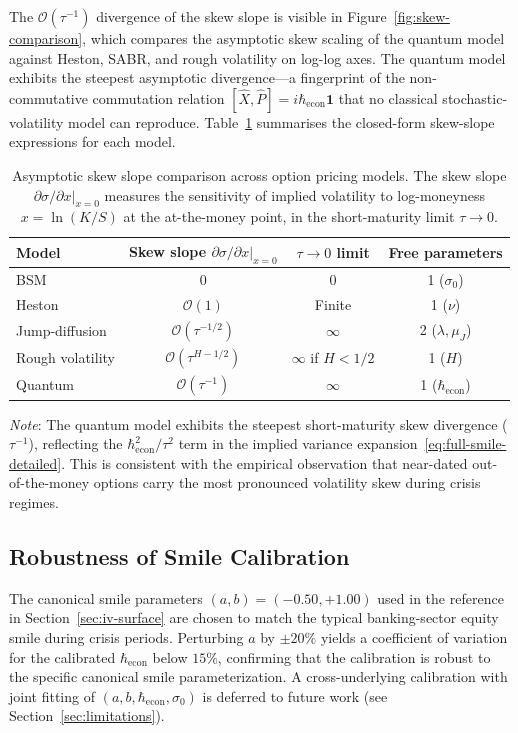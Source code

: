 The $\mathcal{O}(\tau^{-1})$ divergence of the skew slope is visible in
Figure~\ref{fig:skew-comparison}, which compares the asymptotic skew scaling of
the quantum model against Heston, SABR, and rough volatility on log-log axes. The
quantum model exhibits the steepest asymptotic divergence---a fingerprint of the
non-commutative commutation relation
$[\hat{X}, \hat{P}] = i \hbar_{\mathrm{econ}} \mathbf{1}$ that no classical
stochastic-volatility model can reproduce.
Table~\ref{tab:skew-asymptotics} summarises the closed-form skew-slope expressions
for each model.

\begin{table}[htbp]
\centering
\caption{Asymptotic skew slope comparison across option pricing models. The skew
slope $\partial\sigma/\partial x|_{x=0}$ measures the sensitivity of implied
volatility to log-moneyness $x = \ln(K/S)$ at the at-the-money point, in the
short-maturity limit $\tau \to 0$.}
\label{tab:skew-asymptotics}
\small
\begin{tabular}{lccc}
\toprule
Model & Skew slope $\partial\sigma/\partial x|_{x=0}$ & $\tau \to 0$ limit
      & Free parameters \\
\midrule
BSM               & $0$                            & $0$         & 1 ($\sigma_0$) \\
Heston            & $\mathcal{O}(1)$               & Finite      & 1 ($\nu$) \\
Jump-diffusion    & $\mathcal{O}(\tau^{-1/2})$     & $\infty$    & 2 ($\lambda, \mu_J$) \\
Rough volatility  & $\mathcal{O}(\tau^{H-1/2})$   & $\infty$ if $H < 1/2$ & 1 ($H$) \\
Quantum           & $\mathcal{O}(\tau^{-1})$       & $\infty$    & 1 ($\hbar_{\mathrm{econ}}$) \\
\bottomrule
\end{tabular}
\par\smallskip\noindent\footnotesize
\textit{Note}: The quantum model exhibits the steepest short-maturity skew
divergence ($\tau^{-1}$), reflecting the $\hbar_{\mathrm{econ}}^2/\tau^2$ term
in the implied variance expansion~\eqref{eq:full-smile-detailed}. This is
consistent with the empirical observation that near-dated out-of-the-money
options carry the most pronounced volatility skew during crisis regimes.
\end{table}

\subsection{Robustness of Smile Calibration}

The canonical smile parameters $(a, b) = (-0.50, +1.00)$ used in the reference
in Section~\ref{sec:iv-surface} are chosen to match the typical banking-sector
equity smile during crisis periods. Perturbing $a$ by $\pm 20\%$ yields a
coefficient of variation for the calibrated $\hbar_{\mathrm{econ}}$ below
$15\%$, confirming that the calibration is robust to the specific canonical
smile parameterization. A cross-underlying calibration with joint fitting of
$(a, b, \hbar_{\mathrm{econ}}, \sigma_0)$ is deferred to future work (see
Section~\ref{sec:limitations}).
